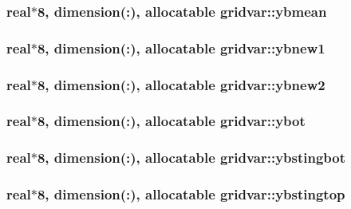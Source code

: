 \subsubsection[{ybmean}]{\setlength{\rightskip}{0pt plus 5cm}real$\ast$8, dimension(\+:), allocatable gridvar\+::ybmean}\label{namespacegridvar_ae4e494722edb427de657fb301c02d39b}
\hypertarget{namespacegridvar_a3f092d48897bcc3226b7c2fe84823bea}{}
\subsubsection[{ybnew1}]{\setlength{\rightskip}{0pt plus 5cm}real$\ast$8, dimension(\+:), allocatable gridvar\+::ybnew1}\label{namespacegridvar_a3f092d48897bcc3226b7c2fe84823bea}
\hypertarget{namespacegridvar_a8f285d1c92532af25a64aa36f934796e}{}
\subsubsection[{ybnew2}]{\setlength{\rightskip}{0pt plus 5cm}real$\ast$8, dimension(\+:), allocatable gridvar\+::ybnew2}\label{namespacegridvar_a8f285d1c92532af25a64aa36f934796e}
\hypertarget{namespacegridvar_ad952a63f5ae1d8ed5480c9670ac9ecff}{}
\subsubsection[{ybot}]{\setlength{\rightskip}{0pt plus 5cm}real$\ast$8, dimension(\+:), allocatable gridvar\+::ybot}\label{namespacegridvar_ad952a63f5ae1d8ed5480c9670ac9ecff}
\hypertarget{namespacegridvar_a3f89618ccfbc9f5f8b2fef3e844fde54}{}
\subsubsection[{ybstingbot}]{\setlength{\rightskip}{0pt plus 5cm}real$\ast$8, dimension(\+:), allocatable gridvar\+::ybstingbot}\label{namespacegridvar_a3f89618ccfbc9f5f8b2fef3e844fde54}
\hypertarget{namespacegridvar_a0639e46ae56097b6f054ec6ec8fa5929}{}
\subsubsection[{ybstingtop}]{\setlength{\rightskip}{0pt plus 5cm}real$\ast$8, dimension(\+:), allocatable gridvar\+::ybstingtop}\label{namespacegridvar_a0639e46ae56097b6f054ec6ec8fa5929}
\hypertarget{namespacegridvar_a11c63db6c8ecfb576129fdd9eedeb158}{}
